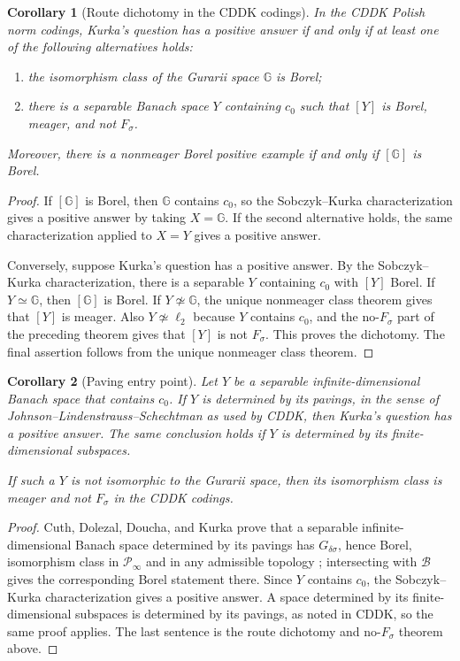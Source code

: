 \documentclass[11pt]{article}
\newtheorem*{corollary}{Corollary}
\begin{document}
\begin{corollary}[Route dichotomy in the CDDK codings]
In the CDDK Polish norm codings, Kurka's question has a positive answer if and
only if at least one of the following alternatives holds:
\begin{enumerate}
\item the isomorphism class of the Gurarii space \(\mathbb G\) is Borel;
\item there is a separable Banach space \(Y\) containing \(c_0\) such that
\([Y]\) is Borel, meager, and not \(F_\sigma\).
\end{enumerate}
Moreover, there is a nonmeager Borel positive example if and only if
\([\mathbb G]\) is Borel.
\end{corollary}

\begin{proof}
If \([\mathbb G]\) is Borel, then \(\mathbb G\) contains \(c_0\), so the
Sobczyk--Kurka characterization gives a positive answer by taking
\(X=\mathbb G\).  If the second alternative holds, the same characterization
applied to \(X=Y\) gives a positive answer.

Conversely, suppose Kurka's question has a positive answer.  By the
Sobczyk--Kurka characterization, there is a separable \(Y\) containing \(c_0\)
with \([Y]\) Borel.  If \(Y\simeq\mathbb G\), then \([\mathbb G]\) is Borel.
If \(Y\not\simeq\mathbb G\), the unique nonmeager class theorem gives that
\([Y]\) is meager.  Also \(Y\not\simeq\ell_2\) because \(Y\) contains \(c_0\),
and the no-\(F_\sigma\) part of the preceding theorem gives that \([Y]\) is not
\(F_\sigma\).  This proves the dichotomy.  The final assertion follows from
the unique nonmeager class theorem.
\end{proof}

\begin{corollary}[Paving entry point]
Let \(Y\) be a separable infinite-dimensional Banach space that contains
\(c_0\).  If \(Y\) is determined by its pavings, in the sense of
Johnson--Lindenstrauss--Schechtman \cite{JLS} as used by CDDK, then Kurka's
question has a positive answer.  The same conclusion holds if \(Y\) is
determined by its finite-dimensional subspaces.

If such a \(Y\) is not isomorphic to the Gurarii space, then its isomorphism
class is meager and not \(F_\sigma\) in the CDDK codings.
\end{corollary}

\begin{proof}
Cuth, Dolezal, Doucha, and Kurka prove that a separable infinite-dimensional
Banach space determined by its pavings has \(G_{\delta\sigma}\), hence Borel,
isomorphism class in \(\mathcal P_\infty\) and in any admissible topology
\cite[the theorem on spaces determined by pavings]{CDDK}; intersecting with
\(\mathcal B\) gives the corresponding Borel statement there.  Since \(Y\)
contains \(c_0\), the Sobczyk--Kurka characterization gives a positive answer.
A space determined by its finite-dimensional subspaces is determined by its
pavings, as noted in CDDK, so the same proof applies.  The last sentence is
the route dichotomy and no-\(F_\sigma\) theorem above.
\end{proof}
\end{document}
